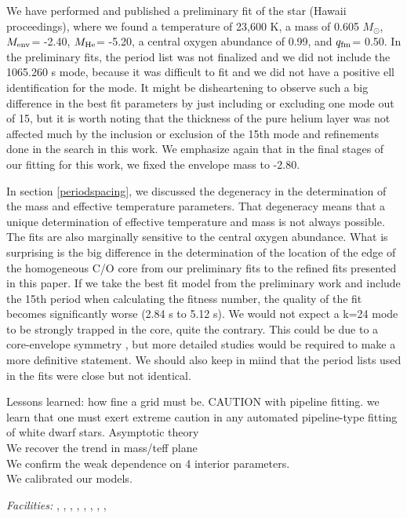 \documentclass[12pt,preprint]{aastex}
\newcommand{\menv}{$M_{\rm env}$}
\newcommand{\mhe}{$M_{\rm He}$}
\newcommand{\qfm}{$q_{\rm fm}$}
\begin{document}
We have performed and published a preliminary fit of the star (Hawaii proceedings), where we found a temperature of 23,600 K, a mass of 0.605 $M_\odot$, \menv = -2.40, \mhe = -5.20, a central oxygen abundance of 0.99, and \qfm = 0.50. In the preliminary fits, the period list was not finalized and we did not include the 1065.260 s mode, because it was difficult to fit and we did not have a positive ell identification for the mode. It might be disheartening to observe such a big difference in the best fit parameters by just including or excluding one mode out of 15, but it is worth noting that the thickness of the pure helium layer was not affected much by the inclusion or exclusion of the 15th mode and refinements done in the search in this work. We emphasize again that in the final stages of our fitting for this work, we fixed the envelope mass to -2.80.

In section \ref{periodspacing}, we discussed the degeneracy in the determination of the mass and effective temperature parameters. That degeneracy means that a unique determination of effective temperature and mass is not always possible.  The fits are also marginally sensitive to the central oxygen abundance. What is surprising is the big difference in the determination of the location of the edge of the homogeneous C/O core from our preliminary fits to the refined fits presented in this paper. If we take the best fit model from the preliminary work and include the 15th period when calculating the fitness number, the quality of the fit becomes significantly worse (2.84 s to 5.12 s). We would not expect a k=24 mode to be strongly trapped in the core, quite the contrary. This could be due to a core-envelope symmetry \citep{Montgomery03}, but more detailed studies would be required to make a more definitive statement. We should also keep in miind that the period lists used in the fits were close but not identical.


Lessons learned: how fine a grid must be. CAUTION with pipeline fitting. we learn that one must 
exert extreme caution in any automated pipeline-type fitting of white dwarf stars.
Asymptotic theory \\
We recover the trend in mass/teff plane \\
We confirm the weak dependence on 4 interior parameters. \\
We calibrated our models.




\acknowledgments


{\it Facilities:} , ,
, 
\facility{}, , ,
, , 
\end{document}
